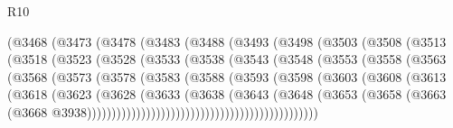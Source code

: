 \begin{lexlean}{R10}
\begin{coremodule}
                (@3468
                  (@3473
                    (@3478
                      (@3483
                        (@3488
                          (@3493
                            (@3498
                              (@3503
                                (@3508
                                  (@3513
                                    (@3518
                                      (@3523
                                        (@3528
                                          (@3533
                                            (@3538
                                              (@3543
                                                (@3548
                                                  (@3553
                                                    (@3558
                                                      (@3563
                                                        (@3568
                                                          (@3573
                                                            (@3578
                                                              (@3583
                                                                (@3588
                                                                  (@3593
                                                                    (@3598
                                                                      (@3603
                                                                        (@3608
                                                                          (@3613
                                                                            (@3618
                                                                              (@3623
                                                                                (@3628
                                                                                  (@3633
                                                                                    (@3638
                                                                                      (@3643
                                                                                        (@3648
                                                                                          (@3653
                                                                                            (@3658
                                                                                              (@3663
                                                                                                (@3668
                                                                                                  @3938)))))))))))))))))))))))))))))))))))))))))))))))

\end{coremodule}
\end{lexlean}
